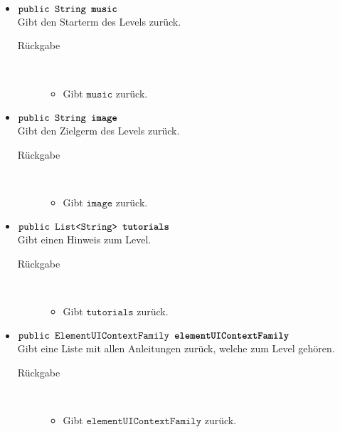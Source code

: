 \begin{description}
\begin{itemize}
		\item $\texttt{public String \textbf{music}}$ \\ Gibt den Starterm des Levels zurück.
		\begin{description}
			\item[Rückgabe] \hfill \\
			\vspace{-.8cm}
			\begin{itemize}
				\item Gibt $\texttt{music}$ zurück.
			\end{itemize}
			\end{description}
			
		\item $\texttt{public String \textbf{image}}$ \\ Gibt den Zielgerm des Levels zurück.
		\begin{description}
			\item[Rückgabe] \hfill \\
			\vspace{-.8cm}
			\begin{itemize}
				\item Gibt $\texttt{image}$ zurück.
			\end{itemize}
			\end{description}
			
		\item $\texttt{public List<String> \textbf{tutorials}}$ \\ Gibt einen Hinweis zum Level.
		\begin{description}
			\item[Rückgabe] \hfill \\
			\vspace{-.8cm}
			\begin{itemize}
				\item Gibt $\texttt{tutorials}$ zurück.
			\end{itemize}
			\end{description}
			
		\item $\texttt{public ElementUIContextFamily \textbf{elementUIContextFamily}}$ \\ Gibt eine Liste mit allen Anleitungen zurück, welche zum Level gehören.
		\begin{description}
			\item[Rückgabe] \hfill \\
			\vspace{-.8cm}
			\begin{itemize}
				\item Gibt $\texttt{elementUIContextFamily}$ zurück.
			\end{itemize}
			\end{description}

		\end{itemize}
	\end{description}
		
